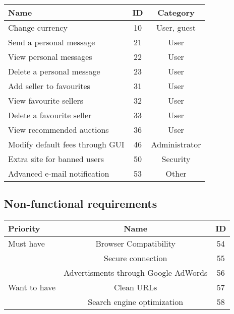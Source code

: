 	\begin{tabular}{l|c c}
	  Name & ID & Category \\ 
	  \hline
	  Change currency & 10 & User, guest \\
	  Send a personal message & 21 & User \\
	  View personal messages & 22 & User \\
	  Delete a personal message & 23 & User \\
	  Add seller to favourites  & 31 & User \\
	  View favourite sellers & 32 & User \\
	  Delete a favourite seller & 33 & User \\
	  View recommended auctions & 36 & User \\
	  Modify default fees through GUI & 46 & Administrator \\
	  Extra site for banned users & 50 & Security \\
	  Advanced e-mail notification & 53 & Other \\
	\end{tabular}
	
	\subsection{Non-functional requirements}
	
	\begin{tabular}{l|c c}
	  Priority & Name & ID \\ 
	  \hline
	  Must have & Browser Compatibility & 54 \\
	  & Secure connection & 55 \\
	  & Advertisments through Google AdWords & 56 \\
	  \hline
	  Want to have & Clean URLs & 57 \\
	  & Search engine optimization & 58 \\
	\end{tabular}
	
	  
	